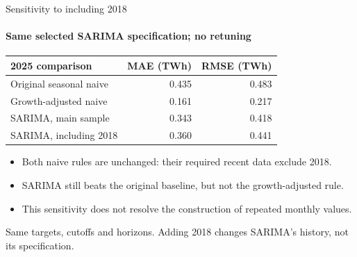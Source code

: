 \documentclass[aspectratio=169,10pt]{beamer}
\newcommand{\Source}[1]{\par\vfill{\fontsize{6.5}{7.5}\selectfont\color{black!65}#1\par}}
\begin{document}
\begin{frame}[t]{Sensitivity to including 2018}
\framesubtitle{Same selected SARIMA specification; no retuning}
\begin{center}
\begin{tabular}{lrr}\toprule
2025 comparison & MAE (TWh) & RMSE (TWh)\\\midrule
Original seasonal naive & 0.435 & 0.483\\
Growth-adjusted naive & 0.161 & 0.217\\
SARIMA, main sample & 0.343 & 0.418\\
SARIMA, including 2018 & 0.360 & 0.441\\\bottomrule
\end{tabular}
\end{center}
\begin{itemize}
\item Both naive rules are unchanged: their required recent data exclude 2018.
\item SARIMA still beats the original baseline, but not the growth-adjusted rule.
\item This sensitivity does not resolve the construction of repeated monthly values.
\end{itemize}
\Source{Same targets, cutoffs and horizons. Adding 2018 changes SARIMA's history, not its specification.}
\end{frame}
\end{document}
